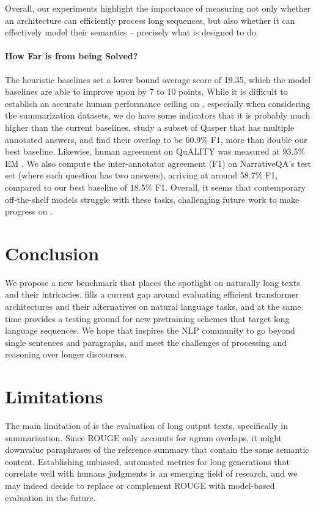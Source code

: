 Overall, our experiments highlight the  importance of measuring not only whether an architecture can efficiently process long sequences, but also whether it can effectively model their semantics -- precisely what \scrolls{} is designed to do.

\paragraph{How Far is \scrolls{} from being Solved?} The heuristic baselines set a lower bound average score of 19.35, which the model baselines are able to improve upon by 7 to 10 points. While it is difficult to establish an accurate human performance ceiling on \scrolls{}, especially when considering the summarization datasets, we do have some indicators that it is probably much higher than the current baselines.
\citet{dasigi-etal-2021-dataset} study a subset of Qasper that has multiple annotated answers, and find their overlap to be 60.9\% F1, more than double our best baseline. Likewise, human agreement on QuALITY was measured at 93.5\% EM \cite{pang2021quality}. We also compute the inter-annotator agreement (F1) on NarrativeQA's test set (where each question has two answers), arriving at around 58.7\% F1, compared to our best baseline of 18.5\% F1. Overall, it seems that contemporary off-the-shelf models struggle with these tasks, challenging future work to make progress on \scrolls{}.

\section{Conclusion}

We propose a new benchmark that places the spotlight on naturally long texts and their intricacies.
\scrolls{} fills a current gap around evaluating efficient transformer architectures and their alternatives on natural language tasks, and at the same time provides a testing ground for new pretraining schemes that target long language sequences. We hope that \scrolls{} inspires the NLP community to go beyond single sentences and paragraphs, and meet the challenges of processing and reasoning over longer discourses.

\section{Limitations}
\label{sec:limitations}

The main limitation of \scrolls{} is the evaluation of long output texts, specifically in summarization. Since ROUGE only accounts for $n$gram overlaps, it might downvalue paraphrases of the reference summary that contain the same semantic content. Establishing unbiased, automated metrics for long generations that correlate well with humans judgments is an emerging field of research, and we may indeed decide to replace or complement ROUGE with model-based evaluation in the future.

